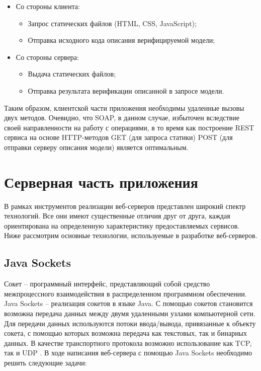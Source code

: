 \begin{itemize}
	\item Со стороны клиента:
	\begin{itemize}
		\item Запрос статических файлов (HTML, CSS, JavaScript);
		\item Отправка исходного кода описания верифицируемой модели;
	\end{itemize}
	\item Со стороны сервера:
	\begin{itemize}
	\item Выдача статических файлов;
	\item Отправка результата верификации описанной в запросе модели.
	\end{itemize}
\end{itemize}

Таким образом, клиентской части приложения необходимы удаленные вызовы двух методов. Очевидно, что SOAP, в данном случае, избыточен вследствие своей направленности на работу с операциями, в то время как построение REST сервиса на основе HTTP-методов GET (для запроса статики) POST (для отправки серверу описания модели) является оптимальным.

\section{Серверная часть приложения}

В рамках инструментов реализации веб-серверов представлен широкий спектр технологий. Все они имеют существенные отличия друг от друга, каждая ориентирована на определенную характеристику предоставляемых сервисов. Ниже рассмотрим основные технологии, используемые в разработке веб-серверов. 

\subsection{Java Sockets}

Сокет – программный интерфейс, представляющий собой средство межпроцессного взаимодействия в распределенном программном обеспечении. Java Sockets – реализация сокетов в языке Java. С помощью сокетов становится возможна передача данных между двумя удаленными узлами компьютерной сети. Для передачи данных используются потоки ввода/вывода, привязанные к объекту сокета, с помощью которых возможна передача как текстовых, так и бинарных данных. В качестве транспортного протокола возможно использование как TCP, так и UDP \cite{sockets}. В ходе написания веб-сервера с помощью Java Sockets необходимо решить следующие задачи:

